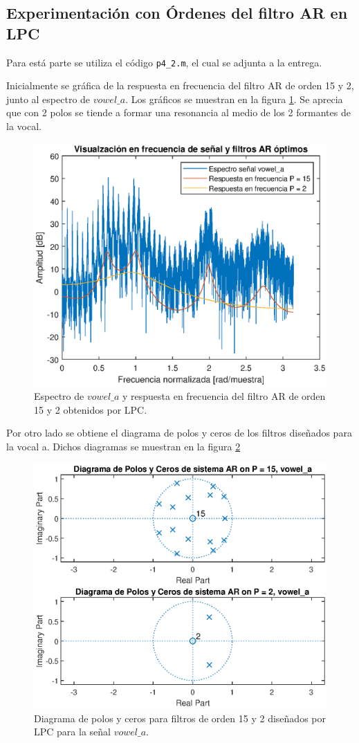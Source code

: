 \subsection{Experimentación con Órdenes del filtro AR en LPC}

Para está parte se utiliza el código \texttt{p4\_2.m}, el cual se adjunta a la entrega.

Inicialmente se gráfica de la respuesta en frecuencia del filtro AR de orden 15 y 2, junto al espectro de $vowel\_a$. Los gráficos se muestran en la figura \ref{fig:p4_21}. Se aprecia que con 2 polos se tiende a formar una resonancia al medio de los 2 formantes de la vocal. 

\begin{figure}[H]
    \centering
    \includegraphics[width = .8\linewidth]{figures/p4_2arbajo.eps}
    \caption{Espectro de $vowel\_a$ y respuesta en frecuencia del filtro AR de orden 15 y 2 obtenidos por LPC.}
    \label{fig:p4_21}
\end{figure}

Por otro lado se obtiene el diagrama de polos y ceros de los filtros diseñados para la vocal a. Dichos diagramas se muestran en la figura \ref{fig:p4_22}

\begin{figure}[H]
    \centering
    \includegraphics[width = .8\linewidth]{figures/p4_22.eps}
    \caption{Diagrama de polos y ceros para filtros de orden 15 y 2 diseñados por LPC para la señal $vowel\_a$.}
    \label{fig:p4_22}
\end{figure}

